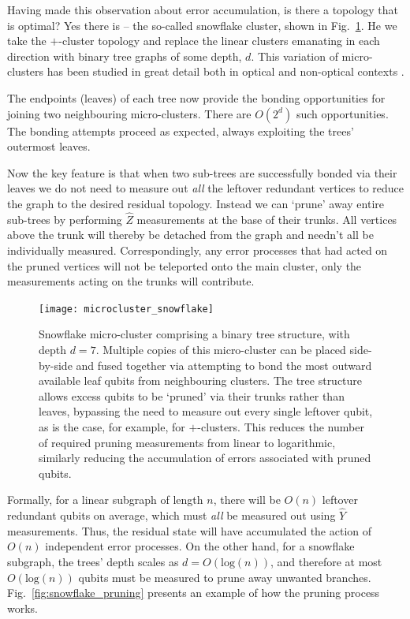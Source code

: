 Having made this observation about error accumulation, is there a topology that is optimal? Yes there is -- the so-called snowflake cluster, shown in Fig.~\ref{fig:snowflake_graph}. He we take the $+$-cluster topology and replace the linear clusters emanating in each direction with binary tree graphs of some depth, $d$. This variation of micro-clusters has been studied in great detail both in optical and non-optical contexts \cite{SimonBenjaminPapers}.

The endpoints (leaves) of each tree now provide the bonding opportunities for joining two neighbouring micro-clusters. There are $O(2^d)$ such opportunities. The bonding attempts proceed as expected, always exploiting the trees' outermost leaves.

Now the key feature is that when two sub-trees are successfully bonded via their leaves we do not need to measure out \textit{all} the leftover redundant vertices to reduce the graph to the desired residual topology. Instead we can `prune' away entire sub-trees by performing $\hat{Z}$ measurements at the base of their trunks. All vertices above the trunk will thereby be detached from the graph and needn't all be individually measured. Correspondingly, any error processes that had acted on the pruned vertices will not be teleported onto the main cluster, only the measurements acting on the trunks will contribute.

\begin{figure}[htpb]
\texttt{[image: microcluster\_snowflake]}
\caption{Snowflake micro-cluster comprising a binary tree structure, with depth \mbox{$d=7$}. Multiple copies of this micro-cluster can be placed side-by-side and fused together via attempting to bond the most outward available leaf qubits from neighbouring clusters. The tree structure allows excess qubits to be `pruned' via their trunks rather than leaves, bypassing the need to measure out every single leftover qubit, as is the case, for example, for $+$-clusters. This reduces the number of required pruning measurements from linear to logarithmic, similarly reducing the accumulation of errors associated with pruned qubits.} \label{fig:snowflake_graph}
\end{figure}

Formally, for a linear subgraph of length $n$, there will be $O(n)$ leftover redundant qubits on average, which must \textit{all} be measured out using $\hat{Y}$ measurements. Thus, the residual state will have accumulated the action of $O(n)$ independent error processes. On the other hand, for a snowflake subgraph, the trees' depth scales as \mbox{$d=O(\mathrm{log}(n))$}, and therefore at most \mbox{$O(\mathrm{log}(n))$} qubits must be measured to prune away unwanted branches. Fig.~\ref{fig:snowflake_pruning} presents an example of how the pruning process works.

